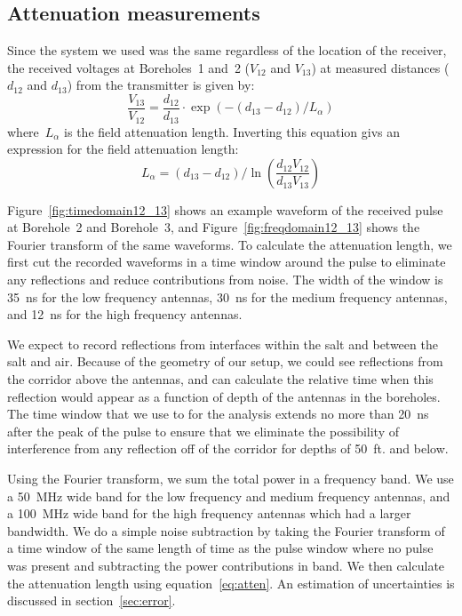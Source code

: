 \documentclass{elsart}
\begin{document}
  \subsection{Attenuation measurements}
Since the system we used was the same regardless of the location of the 
  receiver, the received voltages at Boreholes~1 and~2 ($V_{12}$ and $V_{13}$) at
measured distances ($d_{12}$ and $d_{13}$) from the transmitter is given by:
  \begin{equation}
   \frac{ V_{13}}{V_{12}} = \frac{d_{12}}{d_{13}} \cdot \exp(-(d_{13}-d_{12})/L_\alpha)
  \end{equation}
  where~$L_\alpha$ is the field attenuation length.  Inverting this equation givs an expression for the field attenuation length: 
  \begin{equation}
    \label{eq:atten}
    L_\alpha=(d_{13}-d_{12})/\ln( \frac{d_{12}V_{12}}{d_{13}V_{13}} )
  \end{equation}
  
  Figure~\ref{fig:timedomain12_13} shows an example waveform 
  of the received pulse at Borehole~2 and Borehole~3, and Figure~\ref{fig:freqdomain12_13} 
  shows the Fourier transform of the same waveforms. To calculate the attenuation length, we 
  first cut the recorded waveforms in a time window around the pulse to 
  eliminate any reflections and reduce contributions from noise.  The width 
  of the window is 35~ns for the low frequency antennas, 30~ns for the medium frequency antennas, 
  and 12~ns for the high frequency antennas.  

  We expect to record reflections from interfaces within the salt and between the salt and air.  
  Because of the geometry of our setup, we could see reflections from the corridor above 
  the antennas, and can calculate the relative time when this reflection would appear as a function 
  of depth of the antennas in the boreholes.  The time window that we use to for the analysis 
  extends no more than 20~ns after 
  the peak of the pulse to ensure that we eliminate the possibility of interference from 
  any reflection off of the corridor for depths of 50~ft. and below.  
  
  Using the Fourier transform, we sum the 
  total power in a frequency band.  We use a 50~MHz wide band for the low frequency and 
  medium frequency antennas, and a 100~MHz wide band for the 
  high frequency antennas which had a larger bandwidth.  We do a simple noise subtraction by taking the Fourier transform of 
  a time window of the same length of time as the pulse 
  window where no pulse was present and subtracting the power contributions in band.  
  We then calculate the attenuation length using equation~\ref{eq:atten}.  An estimation 
  of uncertainties is discussed in section~\ref{sec:error}.
  
\end{document}
